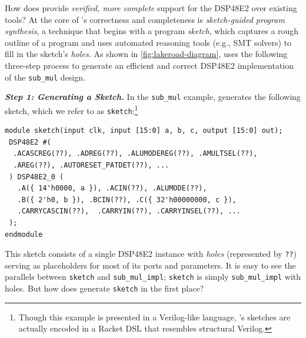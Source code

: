 How does \lr provide 
  \textit{verified, more complete} support
  for the DSP48E2 over existing tools?  
At the core of \lr's
  correctness and completeness
  is
  \textit{sketch-guided program synthesis},
  a technique that  
  begins with a program \textit{sketch}, which
  captures a rough
  outline of a program
  and uses
  automated reasoning tools
  (e.g., SMT solvers)
  to fill in the sketch's \textit{holes.}
As shown in \cref{fig:lakeroad-diagram}, 
  \lr uses the following three-step process  
  to generate an efficient and correct
  DSP48E2 implementation
  of
  the \texttt{sub\_mul}
  design.

\textit{\textbf{Step 1: Generating a Sketch.}}
In
  the \texttt{sub\_mul}
  example,
  \lr
  generates
  the following sketch,
  which we refer to as \texttt{sketch}:\footnote{
Though this example is presented in a Verilog-like language,
  \lr's sketches are actually encoded in a Racket DSL that resembles structural Verilog.
  }
\begin{verbatim}
module sketch(input clk, input [15:0] a, b, c, output [15:0] out);
 DSP48E2 #(
  .ACASCREG(??), .ADREG(??), .ALUMODEREG(??), .AMULTSEL(??), 
  .AREG(??), .AUTORESET_PATDET(??), ...
 ) DSP48E2_0 (
   .A({ 14'h0000, a }), .ACIN(??), .ALUMODE(??), 
   .B({ 2'h0, b }), .BCIN(??), .C({ 32'h00000000, c }),
   .CARRYCASCIN(??),  .CARRYIN(??), .CARRYINSEL(??), ...
 );
endmodule
\end{verbatim}
\noindent
This sketch consists of a single DSP48E2 instance
  with \textit{holes} 
  (represented by \texttt{??}) 
  serving as placeholders for most of its ports and parameters.
It is easy to see  
  the parallels
  between \texttt{sketch}
  and
  \texttt{sub\_mul\_impl};
  \texttt{sketch}
  is simply 
  \texttt{sub\_mul\_impl}
  with holes.
But how does \lr generate \texttt{sketch}
  in the first place?

